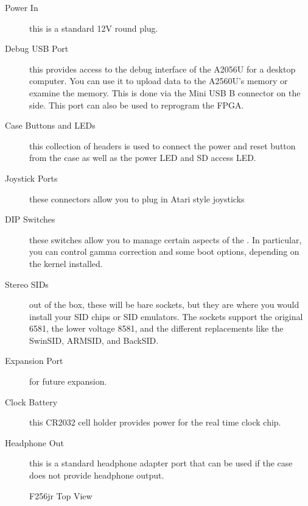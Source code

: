\begin{description}
    \item[Power In] this is a standard 12V round plug.

    \item[Debug USB Port] this provides access to the debug interface
      of the A2056U for a desktop computer. You can use it to upload
      data to the A2560U's memory or examine the memory. This is done
      via the Mini USB B connector on the side. This port can also be
      used to reprogram the FPGA.

    \item[Case Buttons and LEDs] this collection of headers is used to connect the power and reset button from the case as well as the power LED and SD access LED.

    \item[Joystick Ports] these connectors allow you to plug in Atari style joysticks

    \item[DIP Switches] these switches allow you to manage certain aspects of the \foenix. In particular, you can control gamma correction and some boot options, depending on the kernel installed.

    \item[Stereo SIDs] out of the box, these will be bare sockets, but they are where you would install your SID chips or SID emulators. The sockets support the original 6581, the lower voltage 8581, and the different replacements like the SwinSID, ARMSID, and BackSID.

    \item[Expansion Port] for future expansion.

    \item[Clock Battery] this CR2032 cell holder provides power for the real time clock chip.

    \item[Headphone Out] this is a standard headphone adapter port that can be used if the case does not provide headphone output.
\end{description}

\begin{figure}[ht]
    \begin{center}
    \end{center}
    \caption{F256jr Top View}
    \label{fig:top}
\end{figure}

